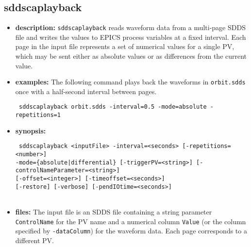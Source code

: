 %
%
\begin{latexonly}
\newpage
\end{latexonly}

\subsection{sddscaplayback}
\label{sddscaplayback}

\begin{itemize}
\item {\bf description:}
\verb+sddscaplayback+ reads waveform data from a multi-page SDDS file and writes the values to
EPICS process variables at a fixed interval. Each page in the input file represents a set of
numerical values for a single PV, which may be sent either as absolute values or as differences
from the current value.

\item {\bf examples:}
The following command plays back the waveforms in \verb+orbit.sdds+ once with a half-second
interval between pages.
\begin{flushleft}{\tt
sddscaplayback orbit.sdds -interval=0.5 -mode=absolute -repetitions=1
}\end{flushleft}

\item {\bf synopsis:}
\begin{flushleft}{\tt
sddscaplayback <inputFile> -interval=<seconds> [-repetitions=<number>]\\
-mode=\{absolute|differential\} [-triggerPV=<string>] [-controlNameParameter=<string>]\\
[-dataColumn=<columnName>] [-offset=<integer>] [-timeoffset=<seconds>]\\
[-factor=<value>] [-restore] [-verbose] [-pendIOtime=<seconds>]\\
[-runControlPV=string=<string>,pingTimeout=<value>]\\
[-runControlDescription=string=<string>]
}\end{flushleft}

\item {\bf files:}
The input file is an SDDS file containing a string parameter \verb+ControlName+ for the PV name
and a numerical column \verb+Value+ (or the column specified by \verb+-dataColumn+) for the
waveform data. Each page corresponds to a different PV.


\end{itemize}
